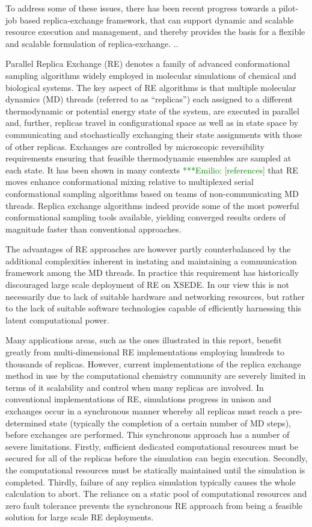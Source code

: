 \documentclass{sig-alternate}
\newcommand{\egnote}[1]{ {\textcolor{green} { ***Emilio: #1 }}}
\begin{document}
To address some of these issues, there has been recent progress
towards a pilot-job based replica-exchange framework, that can support
dynamic and scalable resource execution and management, and thereby
provides the basis for a flexible and scalable formulation of
replica-exchange. ..


Parallel Replica Exchange (RE) denotes a family of advanced
conformational sampling algorithms widely employed in molecular
simulations of chemical and biological systems. The key aspect of RE
algorithms is that multiple molecular dynamics (MD) threads (referred
to as “replicas”) each assigned to a different thermodynamic or
potential energy state of the system, are executed in parallel and, further,
replicas travel in configurational space as well as in state
space by communicating and stochastically exchanging their state
assignments with those of other replicas. Exchanges are controlled by
microscopic reversibility requirements ensuring that feasible
thermodynamic ensembles are sampled at each state.  It has been shown
in many contexts \egnote{[references]} that RE moves enhance
conformational mixing relative to multiplexed serial conformational
sampling algorithms based on teams of non-communicating
MD threads. Replica exchange algorithms indeed provide some of the
most powerful conformational sampling tools available, yielding
converged results orders of magnitude faster than
conventional approaches.

The advantages of RE approaches are however partly counterbalanced by
the additional complexities inherent in instating and maintaining a
communication framework among the MD threads. In practice this
requirement has historically discouraged large scale deployment of RE
on XSEDE. In our view this is not necessarily due to lack of suitable
hardware and networking resources, but rather to the lack of suitable
software technologies capable of efficiently harnessing this latent
computational power.

Many applications areas, such as the ones illustrated in this report,
benefit greatly from multi-dimensional RE implementations employing
hundreds to thousands of replicas. However, current implementations
of the replica exchange method in use by the computational chemistry
community are severely limited in terms of it scalability and control
when many replicas are involved. In conventional implementations of
RE, simulations progress in unison and exchanges occur in a
synchronous manner whereby all replicas must reach a pre-determined
state (typically the completion of a certain number of MD steps),
before exchanges are performed. This synchronous approach has a number
of severe limitations. Firstly, sufficient dedicated computational
resources must be secured for all of the replicas before the
simulation can begin execution. Secondly, the computational resources
must be statically maintained until the simulation is
completed. Thirdly, failure of any replica simulation typically causes
the whole calculation to abort. The reliance on a static pool of
computational resources and zero fault tolerance prevents the
synchronous RE approach from being a feasible solution for large scale
RE deployments.
\end{document}
